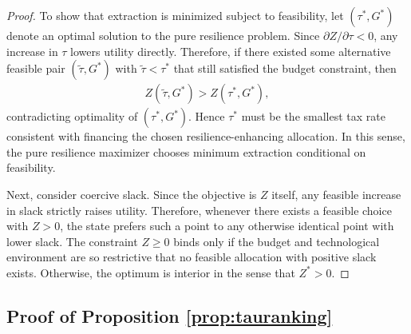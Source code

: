\documentclass[12pt]{article}
\begin{document}
\begin{proof}
To show that extraction is minimized subject to feasibility, let $(\tau^*,G^*)$ denote an optimal solution to the pure resilience problem. Since $\partial Z/\partial \tau<0$, any increase in $\tau$ lowers utility directly. Therefore, if there existed some alternative feasible pair $(\tilde\tau,G^*)$ with $\tilde\tau<\tau^*$ that still satisfied the budget constraint, then
\begin{align}
Z(\tilde\tau,G^*) > Z(\tau^*,G^*),
\end{align}
contradicting optimality of $(\tau^*,G^*)$. Hence $\tau^*$ must be the smallest tax rate consistent with financing the chosen resilience-enhancing allocation. In this sense, the pure resilience maximizer chooses minimum extraction conditional on feasibility.

Next, consider coercive slack. Since the objective is $Z$ itself, any feasible increase in slack strictly raises utility. Therefore, whenever there exists a feasible choice with $Z>0$, the state prefers such a point to any otherwise identical point with lower slack. The constraint $Z\ge 0$ binds only if the budget and technological environment are so restrictive that no feasible allocation with positive slack exists. Otherwise, the optimum is interior in the sense that $Z^*>0$.
\end{proof}

\subsection{Proof of Proposition \ref{prop:tauranking}}
\end{document}
